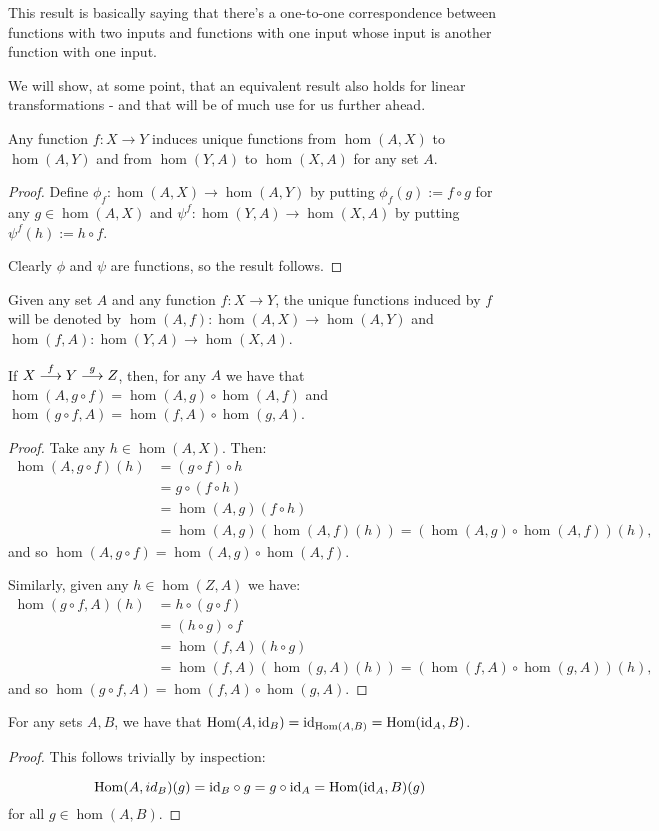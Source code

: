 \begin{rmk}
	This result is basically saying that there's a one-to-one correspondence between functions with two inputs and functions with one input whose input is another function with one input.
\end{rmk}

We will show, at some point, that an equivalent result also holds for linear transformations - and that will be of much use for us further ahead.

\begin{prop}
	Any function $f:X\to Y$ induces unique functions from $\hom(A,X)$ to $\hom(A,Y)$ and from $\hom(Y,A)$ to $\hom(X,A)$ for any set $A$.
\end{prop}
\begin{proof}
	Define $\phi_f:\hom(A,X)\to\hom(A,Y)$ by putting $\phi_f(g):=f\circ g$ for any $g\in\hom(A,X)$ and $\psi^f:\hom(Y,A)\to\hom(X,A)$ by putting $\psi^f(h):=h\circ f$.
	
	Clearly $\phi$ and $\psi$ are functions, so the result follows.
\end{proof}

\begin{df}
	Given any set $A$ and any function $f:X\to Y$, the unique functions induced by $f$ will be denoted by $\hom(A,f):\hom(A,X)\to\hom(A,Y)$ and $\hom(f,A):\hom(Y,A)\to\hom(X,A)$.
\end{df}

\begin{lemma}
	If $X\stackrel{f}{\longrightarrow}Y\stackrel{g}{\longrightarrow}Z$, then, for any $A$ we have that $\hom(A,g\circ f)=\hom(A,g)\circ\hom(A,f)$ and $\hom(g\circ f,A)=\hom(f,A)\circ\hom(g,A)$.
\end{lemma}
\begin{proof}
	Take any $h\in\hom(A,X)$. Then:
	\begin{align*}
		\hom(A,g\circ f)(h)&=(g\circ f)\circ h\\
		&=g\circ(f\circ h)\\
		&=\hom(A,g)(f\circ h)\\
		&=\hom(A,g)(\hom(A,f)(h))=(\hom(A,g)\circ\hom(A,f))(h),
	\end{align*}and so $\hom(A,g\circ f)=\hom(A,g)\circ\hom(A,f)$.
	
	Similarly, given any $h\in\hom(Z,A)$ we have:
	\begin{align*}
		\hom(g\circ f,A)(h)&=h\circ(g\circ f)\\
		&=(h\circ g)\circ f\\
		&=\hom(f,A)(h\circ g)\\
		&=\hom(f,A)(\hom(g,A)(h))=(\hom(f,A)\circ\hom(g,A))(h),
	\end{align*}and so $\hom(g\circ f,A)=\hom(f,A)\circ\hom(g,A)$.
\end{proof}
\begin{lemma}
	For any sets $A,B$, we have that $\mathrm{Hom}(A,{\rm id}_B)={\rm id}_{\mathrm{Hom}(A,B)}=\mathrm{Hom}({\rm id}_A,B)$.
\end{lemma}
\begin{proof}
	This follows trivially by inspection:
	
	\[\mathrm{Hom}(A,id_B)(g)={\rm id}_B\circ g=g\circ{\rm id}_A=\mathrm{Hom}({\rm id}_A,B)(g)\]for all $g\in\hom(A,B)$.
\end{proof}

